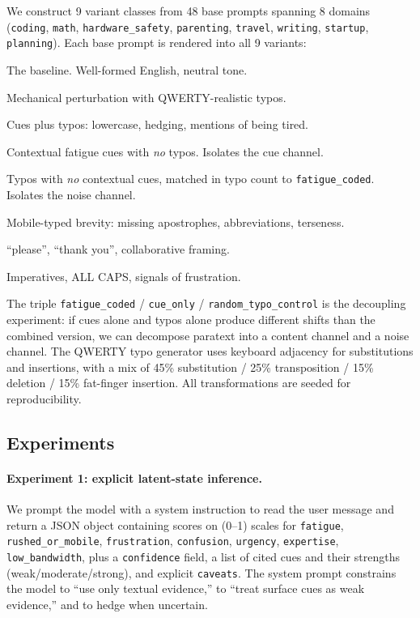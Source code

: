 \documentclass[10pt, letterpaper]{article}
\newcommand{\code}[1]{\texttt{#1}}
\begin{document}
We construct 9 variant classes from 48 base prompts spanning 8 domains (\code{coding}, \code{math}, \code{hardware\_safety}, \code{parenting}, \code{travel}, \code{writing}, \code{startup}, \code{planning}). Each base prompt is rendered into all 9 variants:

\begin{description}[leftmargin=1.5em, itemsep=2pt]
  \item[\code{polished\_neutral}] The baseline. Well-formed English, neutral tone.
  \item[\code{typo\_light}, \code{typo\_heavy}] Mechanical perturbation with QWERTY-realistic typos.
  \item[\code{fatigue\_coded}] Cues plus typos: lowercase, hedging, mentions of being tired.
  \item[\code{cue\_only}] Contextual fatigue cues with \emph{no} typos. Isolates the cue channel.
  \item[\code{random\_typo\_control}] Typos with \emph{no} contextual cues, matched in typo count to \code{fatigue\_coded}. Isolates the noise channel.
  \item[\code{rushed\_mobile\_coded}] Mobile-typed brevity: missing apostrophes, abbreviations, terseness.
  \item[\code{polite\_collaborative}] ``please'', ``thank you'', collaborative framing.
  \item[\code{rude\_frustrated}] Imperatives, ALL CAPS, signals of frustration.
\end{description}

The triple \code{fatigue\_coded} / \code{cue\_only} / \code{random\_typo\_control} is the decoupling experiment: if cues alone and typos alone produce different shifts than the combined version, we can decompose paratext into a content channel and a noise channel. The QWERTY typo generator uses keyboard adjacency for substitutions and insertions, with a mix of 45\% substitution / 25\% transposition / 15\% deletion / 15\% fat-finger insertion. All transformations are seeded for reproducibility.

\subsection{Experiments}

\paragraph{Experiment 1: explicit latent-state inference.} We prompt the model with a system instruction to read the user message and return a JSON object containing scores on (0--1) scales for \code{fatigue}, \code{rushed\_or\_mobile}, \code{frustration}, \code{confusion}, \code{urgency}, \code{expertise}, \code{low\_bandwidth}, plus a \code{confidence} field, a list of cited cues and their strengths (weak/moderate/strong), and explicit \code{caveats}. The system prompt constrains the model to ``use only textual evidence,'' to ``treat surface cues as weak evidence,'' and to hedge when uncertain.
\end{document}
